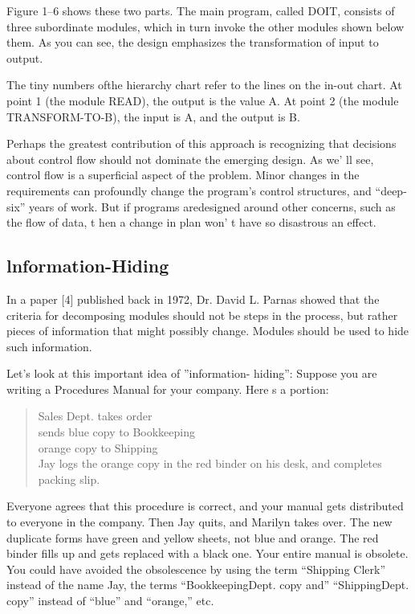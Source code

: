 Figure 1--6 shows these two parts. The main program, called DOIT,
consists of three subordinate modules, which in turn invoke the other
modules shown below them. As you can see, the design emphasizes the
transformation of input to output. 

The tiny numbers ofthe hierarchy chart refer to the lines on the in-out
chart. At point 1 (the module READ), the output is the value A. At
point 2 (the module TRANSFORM-TO-B), the input is A, and the output
is B. 

Perhaps the greatest contribution of this approach is recognizing
that decisions about control flow should not dominate the emerging
design. As we' ll see, control flow is a superficial aspect of the
problem. Minor changes in the requirements can profoundly change the
program's control structures, and {}``deep-six'' years of work.
But if programs aredesigned around other concerns, such as the flow
of data, t hen a change in plan won' t have so disastrous an effect.


\subsection*{lnformation-Hiding }

In a paper {[}4{]} published back in 1972, Dr. David L. Parnas showed
that the criteria for decomposing modules should not be steps in the
process, but rather pieces of information that might possibly change.
Modules should be used to hide such information.

Let's look at this important idea of ''information- hiding'': Suppose
you are writing a Procedures Manual for your company. Here s a portion:

\begin{quote}
Sales Dept. takes order\\
sends blue copy to Bookkeeping\\
orange copy to Shipping\\
Jay logs the orange copy in the red binder on his desk, and completes
packing slip.
\end{quote}
Everyone agrees that this procedure is correct, and your manual gets
distributed to everyone in the company. Then Jay quits, and Marilyn
takes over. The new duplicate forms have green and yellow sheets,
not blue and orange. The red binder fills up and gets replaced with
a black one. Your entire manual is obsolete. You could have avoided
the obsolescence by using the term {}``Shipping Clerk'' instead
of the name Jay, the terms {}``BookkeepingDept. copy and'' {}``ShippingDept.
copy'' instead of {}``blue'' and {}``orange,'' etc.

